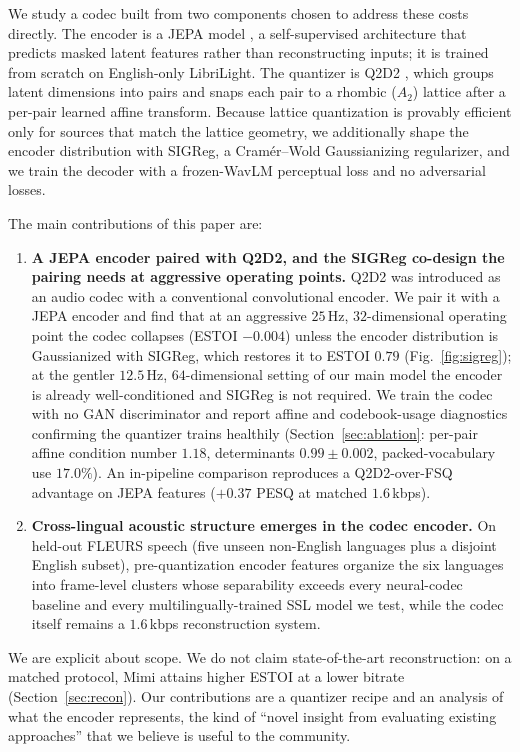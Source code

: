 \documentclass[conference,a4paper]{APSIPA2026}
\begin{document}
We study a codec built from two components chosen to address these costs
directly. The encoder is a JEPA model \cite{jepa_tokenizer}, a self-supervised
architecture that predicts masked latent features rather than reconstructing
inputs; it is trained from scratch on English-only LibriLight. The quantizer
is Q2D2 \cite{q2d2}, which groups latent dimensions into pairs and snaps each
pair to a rhombic ($A_2$) lattice after a per-pair learned affine transform.
Because lattice quantization is provably efficient only for sources that match
the lattice geometry, we additionally shape the encoder distribution with
SIGReg, a Cram\'er--Wold Gaussianizing regularizer, and we train the decoder
with a frozen-WavLM perceptual loss and no adversarial losses.

The main contributions of this paper are:

\begin{enumerate}
\item \textbf{A JEPA encoder paired with Q2D2, and the SIGReg co-design
the pairing needs at aggressive operating points.} Q2D2 was introduced as an
audio codec with a conventional convolutional encoder. We pair it with a JEPA
encoder and find that at an aggressive $25$\,Hz, $32$-dimensional operating
point the codec collapses (ESTOI $-0.004$) unless the encoder distribution is
Gaussianized with SIGReg, which restores it to ESTOI $0.79$
(Fig.~\ref{fig:sigreg}); at the gentler $12.5$\,Hz, $64$-dimensional setting of
our main model the encoder is already well-conditioned and SIGReg is not
required. We train the codec with no GAN discriminator and report affine and
codebook-usage diagnostics confirming the quantizer trains healthily
(Section~\ref{sec:ablation}: per-pair affine condition number $1.18$,
determinants $0.99 \pm 0.002$, packed-vocabulary use $17.0\%$). An in-pipeline
comparison reproduces a Q2D2-over-FSQ advantage on JEPA features ($+0.37$ PESQ
at matched $1.6$\,kbps).
\item \textbf{Cross-lingual acoustic structure emerges in the codec
encoder.} On held-out FLEURS speech (five unseen non-English languages plus a
disjoint English subset), pre-quantization encoder features organize the six
languages into frame-level clusters whose separability exceeds every
neural-codec baseline and every multilingually-trained SSL model we test,
while the codec itself remains a $1.6$\,kbps reconstruction system.
\end{enumerate}

We are explicit about scope. We do not claim state-of-the-art reconstruction:
on a matched protocol, Mimi attains higher ESTOI at a lower bitrate
(Section~\ref{sec:recon}). Our contributions are a quantizer recipe and an
analysis of what the encoder represents, the kind of ``novel insight from
evaluating existing approaches'' that we believe is useful to the community.
\end{document}
